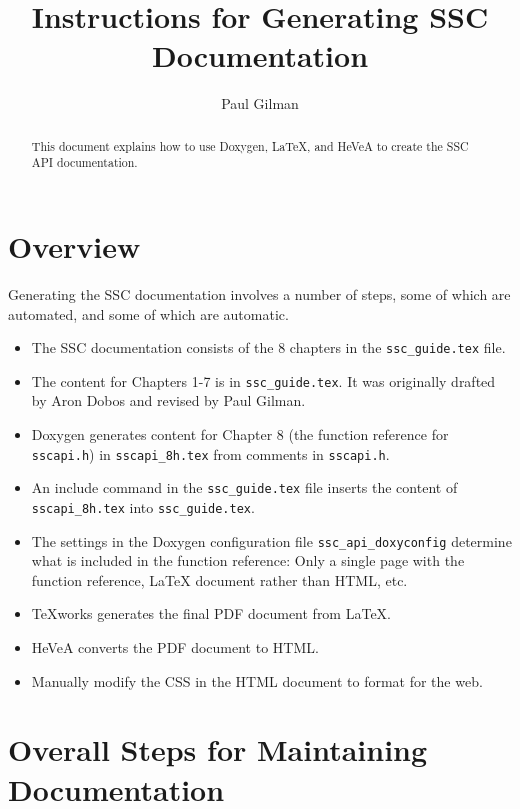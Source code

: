 \documentclass{article}
\title{Instructions for Generating SSC Documentation}
\author{Paul Gilman}
\begin{document}
\maketitle

\begin{abstract}
This document explains how to use Doxygen, LaTeX, and HeVeA to create the SSC API documentation.
\end{abstract}


\section{Overview}

Generating the SSC documentation involves a number of steps, some of which are automated, and some of which are automatic.

\begin{itemize}
\item The SSC documentation consists of the 8 chapters in the \texttt{ssc\_guide.tex} file.

\item The content for Chapters 1-7 is in \texttt{ssc\_guide.tex}. It was originally drafted by Aron Dobos and revised by Paul Gilman.

\item Doxygen generates content for Chapter 8 (the function reference for \texttt{sscapi.h}) in \texttt{sscapi\_8h.tex} from comments in \texttt{sscapi.h}.

\item An include command in the \texttt{ssc\_guide.tex} file inserts the content of \texttt{sscapi\_8h.tex} into \texttt{ssc\_guide.tex}.

\item The settings in the Doxygen configuration file \texttt{ssc\_api\_doxyconfig} determine what is included in the function reference: Only a single page with the function reference, LaTeX document rather than HTML, etc.

\item TeXworks generates the final PDF document from LaTeX.

\item HeVeA converts the PDF document to HTML.

\item Manually modify the CSS in the HTML document to format for the web.

\end{itemize}

\section{Overall Steps for Maintaining Documentation}
\end{document}
